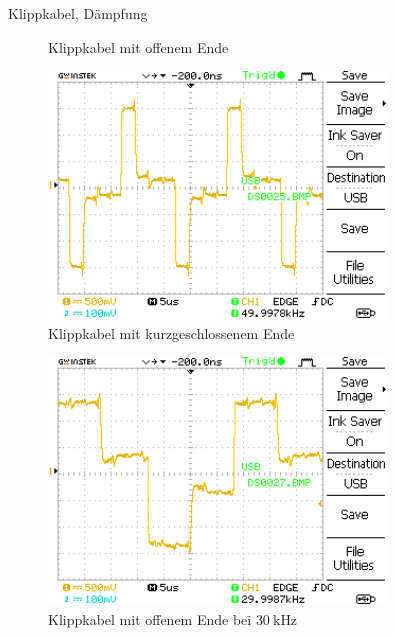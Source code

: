 \documentclass[ngerman]{scrartcl}
\theoremstyle{definition}
\begin{document}
\begin{aufgabe}{Klippkabel, Dämpfung}
\begin{unteraufgabe}
\begin{figure}[H]
					\caption{Klippkabel mit offenem Ende}
					\label{fig:DS0017}
				\end{figure}
			\end{unteraufgabe}
			\begin{unteraufgabe}
				\begin{figure}[H]
					\centering
					\includegraphics[width=0.8\textwidth]{MesswerteVersuch1/DS0025.png}
					\caption{Klippkabel mit kurzgeschlossenem Ende}
					\label{fig:DS0025}
				\end{figure}
			\end{unteraufgabe}
			\begin{unteraufgabe}
				\begin{figure}[H]
					\centering
					\includegraphics[width=0.8\textwidth]{MesswerteVersuch1/DS0027.png}
					\caption{Klippkabel mit offenem Ende bei $\SI{30}{\kilo\hertz}$}
					\label{fig:DS0030}
				\end{figure}
			\end{unteraufgabe}
			\begin{unteraufgabe}
				\begin{figure}[H]

\end{figure}
\end{unteraufgabe}
\end{aufgabe}
\end{document}
